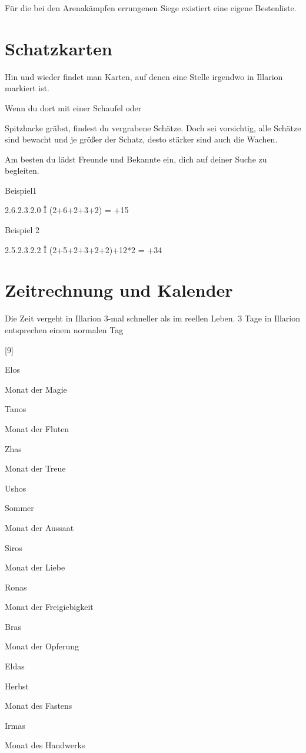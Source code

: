 \documentclass[a4paper,11pt]{book}
\begin{document}
Für die bei den Arenakämpfen errungenen Siege existiert eine eigene Bestenliste.

\section{Schatzkarten}

Hin und wieder findet man Karten, auf denen eine Stelle irgendwo in Illarion markiert ist.

Wenn du dort mit einer Schaufel oder

Spitzhacke gräbst, findest du vergrabene Schätze. Doch sei vorsichtig, alle Schätze sind bewacht und je größer der Schatz, desto stärker sind auch die Wachen.

Am besten du lädst Freunde und Bekannte ein, dich auf deiner Suche zu begleiten.

Beispiel1

2.6.2.3.2.0  Î (2+6+2+3+2) = +15%

Beispiel 2

2.5.2.3.2.2  Î (2+5+2+3+2+2)+12*2 = +34%

\section{Zeitrechnung und Kalender}

Die Zeit vergeht in Illarion 3-mal schneller als im reellen Leben. 3 Tage in Illarion entsprechen einem normalen Tag

[9]

Elos

Monat der Magie

Tanos

Monat der Fluten

Zhas

Monat der Treue

Ushos

Sommer

Monat der Aussaat

Siros

Monat der Liebe

Ronas

Monat der Freigiebigkeit

Bras

Monat der Opferung

Eldas

Herbst

Monat des Fastens

Irmas

Monat des Handwerks
\end{document}

